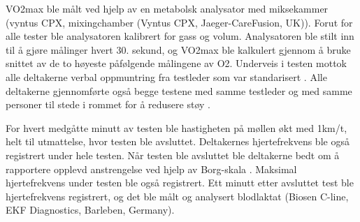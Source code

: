\documentclass[
]{book}
\begin{document}
VO2max ble målt ved hjelp av en metabolsk analysator med miksekammer (vyntus CPX, mixingchamber (Vyntus CPX, Jaeger-CareFusion, UK)). Forut for alle tester ble analysatoren kalibrert for gass og volum. Analysatoren ble stilt inn til å gjøre målinger hvert 30. sekund, og VO2max ble kalkulert gjennom å bruke snittet av de to høyeste påfølgende målingene av O2. Underveis i testen mottok alle deltakerne verbal oppmuntring fra testleder som var standarisert \citep{halperin2015}. Alle deltakerne gjennomførte også begge testene med samme testleder og med samme personer til stede i rommet for å redusere støy \citep{halperin2015}.

For hvert medgåtte minutt av testen ble hastigheten på møllen økt med 1km/t, helt til utmattelse, hvor testen ble avsluttet. Deltakernes hjertefrekvens ble også registrert under hele testen. Når testen ble avsluttet ble deltakerne bedt om å rapportere opplevd anstrengelse ved hjelp av Borg-skala \citep{borg1982}. Maksimal hjertefrekvens under testen ble også registrert. Ett minutt etter avsluttet test ble hjertefrekvens registrert, og det ble målt og analysert blodlaktat (Biosen C-line, EKF Diagnostics, Barleben, Germany).

\providecommand{\docline}[3]{\noalign{\global\setlength{\arrayrulewidth}{#1}}\arrayrulecolor[HTML]{#2}\cline{#3}}

\setlength{\tabcolsep}{2pt}

\renewcommand*{\arraystretch}{1.5}
\end{document}
